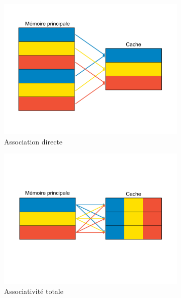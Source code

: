 \begin{figure}[!h]
	\begin{subfigure}[t]{0.5\linewidth}
		\includegraphics[width=\linewidth]{graphics/figures/cache-direct-mapping.pdf}
		\caption{\label{fig:direct_mapping}Association directe}
	\end{subfigure}
	\begin{subfigure}[t]{0.5\linewidth}
		\includegraphics[width=\linewidth]{graphics/figures/cache-full-assoc.pdf}
		\caption{\label{fig:full_assoc}Associativité totale}
	\end{subfigure}
	\begin{subfigure}[b]{0.5\linewidth}

\end{subfigure}
\end{figure}
